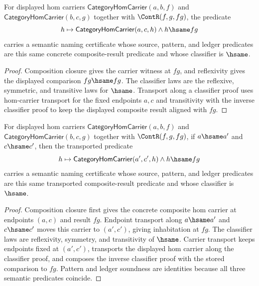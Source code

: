 \begin{theorem}
\label{thm:category-hom-carrier-comp-result-semantic-namecert}
For displayed hom carriers
$\mathsf{CategoryHomCarrier}(a,b,f)$ and
$\mathsf{CategoryHomCarrier}(b,c,g)$ together with $\ContR(f,g,fg)$, the
predicate
$$
h\mapsto \mathsf{CategoryHomCarrier}(a,c,h)\land h\hsame fg
$$
carries a semantic naming certificate whose source, pattern, and ledger
predicates are this same concrete composite-result predicate and whose
classifier is $\hsame$.
\end{theorem}
\begin{proof}
Composition closure gives the carrier witness at $fg$, and reflexivity gives
the displayed comparison $fg\hsame fg$. The classifier laws are the reflexive,
symmetric, and transitive laws for $\hsame$. Transport along a classifier proof
uses hom-carrier transport for the fixed endpoints $a,c$ and transitivity with
the inverse classifier proof to keep the displayed composite result aligned
with $fg$.
\end{proof}

\begin{theorem}
\label{thm:category-hom-carrier-composite-result-endpoint-semantic-name-certificate}
For displayed hom carriers
$\mathsf{CategoryHomCarrier}(a,b,f)$ and
$\mathsf{CategoryHomCarrier}(b,c,g)$ together with $\ContR(f,g,fg)$, if
$a\hsame a'$ and $c\hsame c'$, then the transported predicate
$$
h\mapsto \mathsf{CategoryHomCarrier}(a',c',h)\land h\hsame fg
$$
carries a semantic naming certificate whose source, pattern, and ledger
predicates are this same transported composite-result predicate and whose
classifier is $\hsame$.
\end{theorem}
\begin{proof}
Composition closure first gives the concrete composite hom carrier at
endpoints $(a,c)$ and result $fg$. Endpoint transport along $a\hsame a'$ and
$c\hsame c'$ moves this carrier to $(a',c')$, giving inhabitation at $fg$.
The classifier laws are reflexivity, symmetry, and transitivity of $\hsame$.
Carrier transport keeps endpoints fixed at $(a',c')$, transports the displayed
hom carrier along the classifier proof, and composes the inverse classifier
proof with the stored comparison to $fg$. Pattern and ledger soundness are
identities because all three semantic predicates coincide.
\end{proof}

